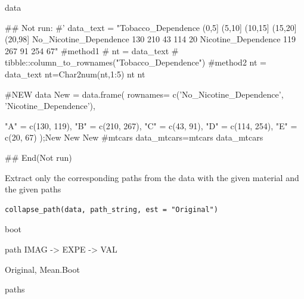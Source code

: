 \documentclass[a4paper]{book}
\begin{document}
%
\begin{Value}
data
\end{Value}
%
\begin{Examples}
\begin{ExampleCode}

\#\# Not run: 
#'
data_text = "Tobacco_Dependence (0,5] (5,10] (10,15] (15,20] (20,98]
No_Nicotine_Dependence 130 210 43 114 20
Nicotine_Dependence 119 267 91 254 67"
#method1
# nt = data_text%
#         tibble::column_to_rownames("Tobacco_Dependence")
#method2
nt = data_text%
nt=Char2num(nt,1:5)
nt
nt %

#NEW data
New = data.frame(
  rownames= c('No_Nicotine_Dependence', 'Nicotine_Dependence'),

  "A" = c(130, 119),
  "B" = c(210, 267),
  "C" = c(43, 91),
  "D" = c(114, 254),
  "E" = c(20, 67)
);New
New%
New%
#mtcars
data_mtcars=mtcars%
data_mtcars%




## End(Not run)


\end{ExampleCode}
\end{Examples}
%
\begin{Description}
Extract only the corresponding paths from the data with the given material and the given paths
\end{Description}
%
\begin{Usage}
\begin{verbatim}
collapse_path(data, path_string, est = "Original")
\end{verbatim}
\end{Usage}
%
\begin{Arguments}
\begin{ldescription}
\item[\code{data}] boot

\item[\code{path\_string}] path IMAG -> EXPE -> VAL

\item[\code{est}] Original, Mean.Boot
\end{ldescription}
\end{Arguments}
%
\begin{Value}
paths
\end{Value}
\end{document}
